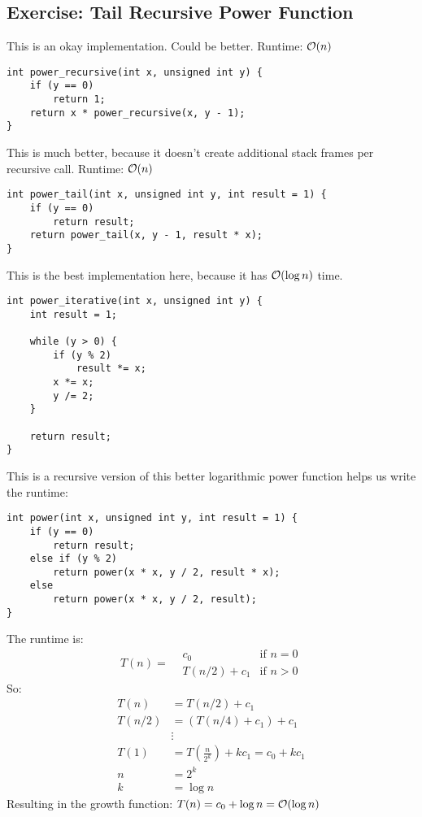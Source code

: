 \subsection{Exercise: Tail Recursive Power Function}
This is an okay implementation. Could be better. Runtime: $\mathcal{O}(n)$
\begin{lstlisting}[style=C++]
int power_recursive(int x, unsigned int y) {
    if (y == 0)
        return 1;
    return x * power_recursive(x, y - 1);
}
\end{lstlisting}
This is much better, because it doesn't create additional stack frames per recursive call. Runtime: $\mathcal{O}(n)$
\begin{lstlisting}[style=C++]
int power_tail(int x, unsigned int y, int result = 1) {
    if (y == 0)
        return result;
    return power_tail(x, y - 1, result * x);
}
\end{lstlisting}
This is the best implementation here, because it has $\mathcal{O}(\log{n})$ time.
\begin{lstlisting}[style=C++]
int power_iterative(int x, unsigned int y) {
    int result = 1;

    while (y > 0) {
        if (y % 2)
            result *= x;
        x *= x;
        y /= 2;
    }

    return result;
}
\end{lstlisting}
This is a recursive version of this better logarithmic power function helps us write the runtime:
\begin{lstlisting}[style=C++]
int power(int x, unsigned int y, int result = 1) {
    if (y == 0)
        return result;
    else if (y % 2)
        return power(x * x, y / 2, result * x);
    else
        return power(x * x, y / 2, result);
}	
\end{lstlisting}
The runtime is:
$$T(n)=\begin{aligned}
	&c_0 &\text{if } n=0\\
	&T(n/2)+c_1 &\text{if } n>0
\end{aligned}$$
So:
$$\begin{aligned}
	T(n) &= T(n/2)+c_1\\
	T(n/2) &= (T(n/4) + c_1)+c_1 \\
	&\vdots \\
	T(1) &= T(\frac{n}{2^k}) + kc_1=c_0+kc_1\\
	n &= 2^k\\
	k &= \log{n}
\end{aligned}$$
Resulting in the growth function: $T(n)=c_0 + \log{n} = \mathcal{O}(\log{n})$

